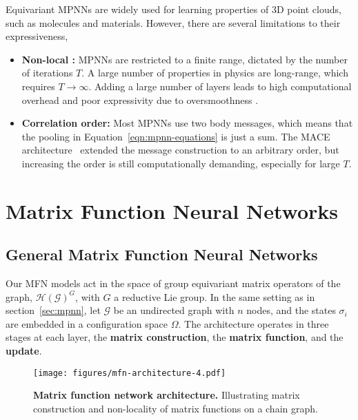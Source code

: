 \documentclass{article} \usepackage{iclr2024_conference,times}
\begin{document}
Equivariant MPNNs are widely used for learning properties of 3D point clouds, such as molecules and materials. However, there are several limitations to their expressiveness,
\begin{itemize}
    \item \textbf{Non-local :} MPNNs are restricted to a finite range, dictated by the number of iterations $T$.
    A large number of properties in physics are long-range, which requires $T \to \infty$. Adding a large number of layers leads to high computational overhead and poor expressivity due to oversmoothness \citep{di2023over}.
    \item \textbf{Correlation order:} Most MPNNs use two body messages, which means that the pooling in Equation~\ref{eqn:mpnn-equations} is just a sum. The MACE architecture~\citep{Batatia2022mace} extended the message construction to an arbitrary order, but increasing the order is still computationally demanding, especially for large $T$.
\end{itemize}

\section{Matrix Function Neural Networks}
\vspace{-6pt}
\label{sec:mfnns}
\subsection{General Matrix Function Neural Networks}
\vspace{-6pt}
Our MFN models act in the space of group equivariant matrix operators of the graph, $\mathcal{H}(\mathcal{G})^{G}$, with $G$ a reductive Lie group. In the same setting as in section~\ref{sec:mpnn}, let $\mathcal{G}$ be an undirected graph with $n$ nodes, and the states $\sigma_{i}$ are embedded in a configuration space $\Omega$. The architecture operates in three stages at each layer, the \textbf{matrix construction}, the \textbf{matrix function}, and the \textbf{update}.
\begin{figure}[tp]
    \centering
    \texttt{[image: figures/mfn-architecture-4.pdf]}
    \label{fig:enter-label}
	\caption{\textbf{Matrix function network architecture.} Illustrating matrix construction and non-locality of matrix functions on a chain graph.}
    \label{fig:MFN-framework}
    \vspace{-16pt}
\end{figure}
\vspace{-5pt}
\end{document}
